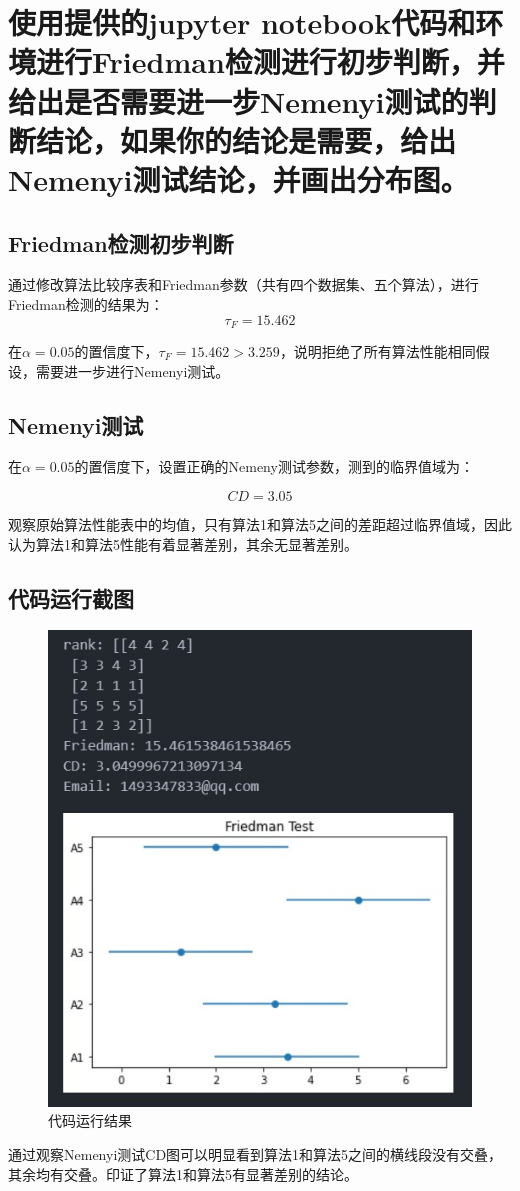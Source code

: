 \documentclass{article}
\begin{document}
\section{使用提供的jupyter notebook代码和环境进行Friedman检测进行初步判断，并给出是否需要进一步Nemenyi测试的判断结论，如果你的结论是需要，给出Nemenyi测试结论，并画出分布图。}

\subsection{Friedman检测初步判断}
通过修改算法比较序表和Friedman参数（共有四个数据集、五个算法），进行Friedman检测的结果为：
$$ \tau_F = 15.462  $$

在$\alpha=0.05$的置信度下，$ \tau_F = 15.462 >3.259 $，说明拒绝了所有算法性能相同假设，需要进一步进行Nemenyi测试。

\subsection{Nemenyi测试}
在$\alpha=0.05$的置信度下，设置正确的Nemeny测试参数，测到的临界值域为：

$$CD=3.05$$

观察原始算法性能表中的均值，只有算法1和算法5之间的差距超过临界值域，因此认为算法1和算法5性能有着显著差别，其余无显著差别。

\subsection{代码运行截图}

\begin{figure}[htbp]
	\centering
	\includegraphics[scale=0.8]{1.jpg}
	\caption{代码运行结果}
	\label{figure}
\end{figure}
通过观察Nemenyi测试CD图可以明显看到算法1和算法5之间的横线段没有交叠，其余均有交叠。印证了算法1和算法5有显著差别的结论。
\end{document}
